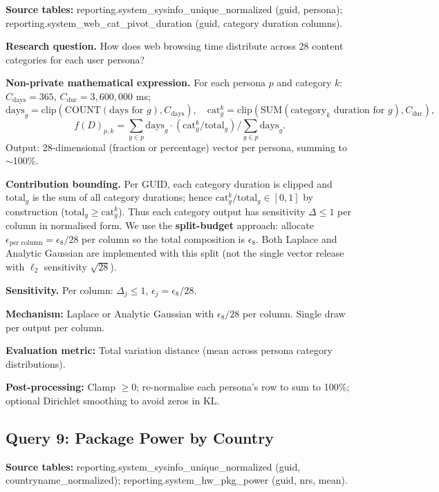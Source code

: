 \documentclass[12pt,letterpaper]{article}
\begin{document}
\textbf{Source tables:} reporting.system\_sysinfo\_unique\_normalized (guid, persona);
\newline
reporting.system\_web\_cat\_pivot\_duration (guid, category duration columns).

\textbf{Research question.} How does web browsing time distribute across 28 content categories for each user persona?

\textbf{Non-private mathematical expression.} For each persona $p$ and category $k$: $C_{\text{days}} = 365$, $C_{\text{dur}} = 3{,}600{,}000$ ms;
\[
\text{days}_g = \text{clip}(\text{COUNT}(\text{days for } g), C_{\text{days}}), \quad
\text{cat}_g^k = \text{clip}(\text{SUM}(\text{category}_k \text{ duration for } g), C_{\text{dur}}),
\]
\[
f(D)_{p,k} = \sum_{g \in p} \text{days}_g \cdot (\text{cat}_g^k / \text{total}_g) \big/ \sum_{g \in p} \text{days}_g.
\]
Output: 28-dimensional (fraction or percentage) vector per persona, summing to $\sim$100\%.

\textbf{Contribution bounding.} Per GUID, each category duration is clipped and $\text{total}_g$ is the sum of all category durations; hence $\text{cat}_g^k / \text{total}_g \in [0,1]$ by construction ($\text{total}_g \geq \text{cat}_g^k$). Thus each category output has sensitivity $\Delta \leq 1$ per column in normalised form. We use the \textbf{split-budget} approach: allocate $\epsilon_{\text{per column}} = \epsilon_8/28$ per column so the total composition is $\epsilon_8$. Both Laplace and Analytic Gaussian are implemented with this split (not the single vector release with $\ell_2$ sensitivity $\sqrt{28}$).

\textbf{Sensitivity.} Per column: $\Delta_j \leq 1$, $\epsilon_j = \epsilon_8/28$.

\textbf{Mechanism:} Laplace or Analytic Gaussian with $\epsilon_8/28$ per column. Single draw per output per column.

\textbf{Evaluation metric:} Total variation distance (mean across persona category distributions).

\textbf{Post-processing:} Clamp $\geq 0$; re-normalise each persona's row to sum to 100\%; optional Dirichlet smoothing to avoid zeros in KL.

\subsection{Query 9: Package Power by Country}
\label{sec:q9}

\textbf{Source tables:} reporting.system\_sysinfo\_unique\_normalized (guid, countryname\_normalized); reporting.system\_hw\_pkg\_power (guid, nrs, mean).
\end{document}
